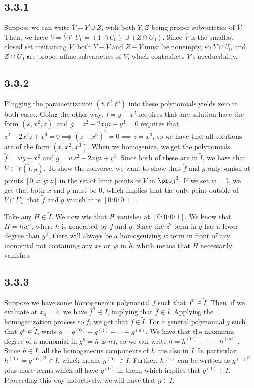 \documentclass{article}
\newcommand{\conj}{\overline}
\begin{document}
\subsection*{3.3.1}
Suppose we can write $\overline{V}=Y\cup Z$, with both $Y,Z$ being proper subvarieties of $\conj{V}$. Then, we have $V=\conj{V}\cap U_0=(Y\cap U_0)\cup(Z\cap U_0)$. Since $\conj{V}$ is the smallest closed set containing $V$, both $Y-V$ and $Z-V$ must be nonempty, so $Y\cap U_0$ and $Z\cap U_0$ are proper affine subvarieties of $V$, which contradicts $V$'s irreducibility.
\subsection*{3.3.2}
Plugging the parametrization $(t,t^2,t^3)$ into these polynomials yields zero in both cases. Going the other way, $f=y-x^2$ requires that any solution have the form $(x,x^2,z)$, and $g=z^2-2xyz+y^3=0$ requires that $z^2-2x^3z+x^6=0\implies(z-x^3)^2=0\implies z=x^3$, so we have that all solutions are of the form $(x,x^2,x^3)$. When we homogenize, we get the polynomials $\tilde{f}=wy-x^2$ and $\tilde{g}=wz^2-2xyz+y^3$. Since both of these are in $\tilde{I}$, we have that $\conj{V}\subset V(\tilde{f},\tilde{g})$. To show the converse, we want to show that $\tilde{f}$ and $\tilde{g}$ only vanish at points $[0:x:y:z]$ in the set of limit points of $V$ in $\proj^3$. If we set $w=0$, we get that both $x$ and $y$ must be $0$, which implies that the only point outside of $\conj{V}\cap U_w$ that $\tilde{f}$ and $\tilde{g}$ vanish at is $[0:0:0:1]$. 

Take any $H\in\tilde{I}$. We now wts that $H$ vanishes at $[0:0:0:1]$. We know that $H=\tilde{h}w^n$, where $h$ is generated by $f$ and $g$. Since the $z^2$ term in $g$ has a lower degree than $y^3$, there will always be a homogenizing $w$ term in front of any monomial not containing any $x$s or $y$s in $\tilde{h}$, which means that $H$ necessarily vanishes.
\subsection*{3.3.3}
Suppose we have some homogeneous polynomial $f$ such that $f^n\in\tilde{I}$. Then, if we evaluate at $x_0=1$, we have $\conj{f}^n\in I$, implying that $\conj{f}\in I$. Applying the homogenization process to $\conj{f}$, we get that $f\in\tilde{I}$. For a general polynomial $g$ such that $g^n\in\tilde{I}$, write $g=g^{(0)}+g^{(1)}+\cdots+g^{(d)}$. We have that the maximum degree of a monomial in $g^n=h$ is $nd$, so we can write $h=h^{(0)}+\cdots+h^{(nd)}$. Since $h\in\tilde{I}$, all the homogeneous components of $h$ are also in $\tilde{I}$. In particular, $h^{(0)}={g^{(0)}}^n\in\tilde{I}$, which means $g^{(0)}\in\tilde{I}$. Further, $h^{(n)}$ can be written as ${g^{(1)}}^n$ plus more terms which all have $g^{(0)}$ in them, which implies that $g^{(1)}\in\tilde{I}$. Proceeding this way inductively, we will have that $g\in\tilde{I}$.
\end{document}
